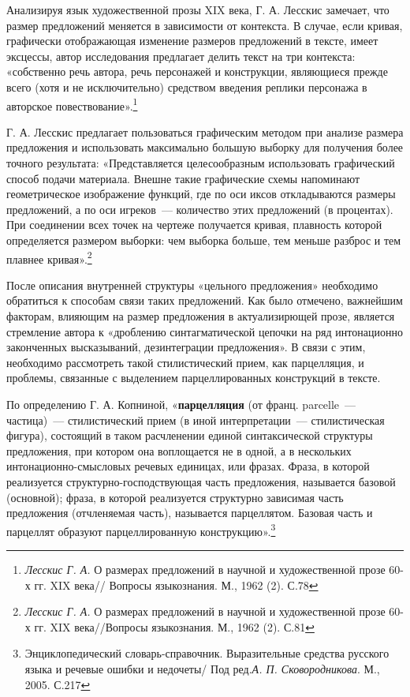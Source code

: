 \documentclass{kursa4}
\begin{document}
{      Анализируя язык художественной прозы XIX века, Г. А. Лесскис замечает, что размер предложений меняется в зависимости от контекста. В случае, если кривая, графически отображающая изменение размеров предложений в тексте, имеет эксцессы, автор исследования предлагает делить текст на три контекста: «собственно речь автора, речь персонажей и конструкции, являющиеся прежде всего (хотя и не исключительно) средством введения реплики персонажа в авторское повествование».\footnote{\textit{{ Лесскис Г. А. }}{О размерах предложений в научной и художественной прозе 60-х гг. XIX века// Вопросы языкознания. М., 1962 (2). С.78}}

      Г. А. Лесскис предлагает пользоваться графическим методом при анализе размера предложения и использовать максимально большую выборку для получения более точного результата: «Представляется целесообразным использовать графический способ подачи материала. Внешне такие графические схемы напоминают геометрическое изображение функций, где по оси иксов откладываются размеры предложений, а по оси игреков~--- количество этих предложений (в процентах). При соединении всех точек на чертеже получается кривая, плавность которой определяется размером выборки: чем выборка больше, тем меньше разброс и тем плавнее кривая».\footnote{\textit{{ Лесскис Г. А. }}{О размерах предложений в научной и художественной прозе 60-х гг. XIX века//Вопросы языкознания. М., 1962 (2). С.81}}

      После описания внутренней структуры «цельного предложения» необходимо обратиться к способам связи таких предложений. Как было отмечено, важнейшим факторам, влияющим на размер предложения в актуализирющей прозе, является стремление автора к «дроблению синтагматической цепочки на ряд интонационно законченных высказываний, дезинтеграции предложения». В связи с этим, необходимо рассмотреть такой стилистический прием, как парцелляция, и проблемы, связанные с выделением парцеллированных конструкций в тексте. 

      По определению Г. А. Копниной, «\textbf{парцелляция} (от франц. parcelle~--- частица)~--- стилистический прием (в иной интерпретации~--- стилистическая фигура), состоящий в таком расчленении единой синтаксической структуры предложения, при котором она воплощается не в одной, а в нескольких интонационно-смысловых речевых единицах, или фразах. Фраза, в которой реализуется структурно-господствующая часть предложения, называется базовой (основной); фраза, в которой реализуется структурно зависимая часть предложения (отчленяемая часть), называется парцеллятом. Базовая часть и парцеллят образуют парцеллированную конструкцию».\footnote{Энциклопедический словарь-справочник. Выразительные средства русского языка и речевые ошибки и недочеты/ Под ред.\textit{А. П. Сковородникова}{. М., 2005. С.217}}

}
\end{document}
